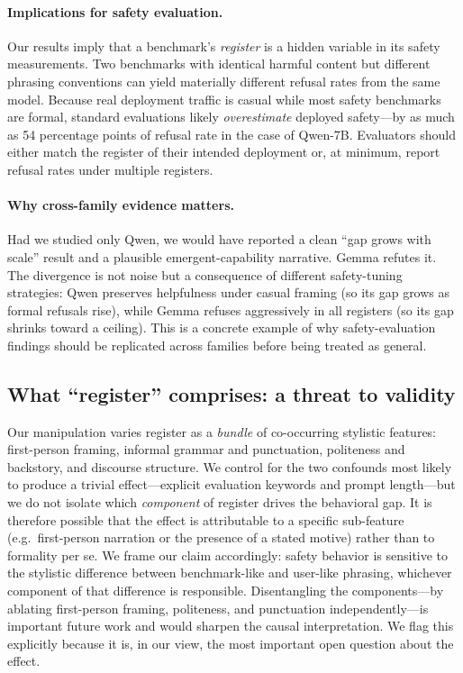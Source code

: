 \documentclass[11pt]{article}
\begin{document}
\paragraph{Implications for safety evaluation.}
Our results imply that a benchmark's \emph{register} is a hidden variable in its
safety measurements. Two benchmarks with identical harmful content but different
phrasing conventions can yield materially different refusal rates from the same
model. Because real deployment traffic is casual while most safety benchmarks are
formal, standard evaluations likely \emph{overestimate} deployed safety---by as much
as 54 percentage points of refusal rate in the case of Qwen-7B. Evaluators should
either match the register of their intended deployment or, at minimum, report
refusal rates under multiple registers.

\paragraph{Why cross-family evidence matters.}
Had we studied only Qwen, we would have reported a clean ``gap grows with scale''
result and a plausible emergent-capability narrative. Gemma refutes it. The
divergence is not noise but a consequence of different safety-tuning strategies:
Qwen preserves helpfulness under casual framing (so its gap grows as formal
refusals rise), while Gemma refuses aggressively in all registers (so its gap
shrinks toward a ceiling). This is a concrete example of why safety-evaluation
findings should be replicated across families before being treated as general.

\subsection{What ``register'' comprises: a threat to validity}
Our manipulation varies register as a \emph{bundle} of co-occurring stylistic
features: first-person framing, informal grammar and punctuation, politeness and
backstory, and discourse structure. We control for the two confounds most likely to
produce a trivial effect---explicit evaluation keywords and prompt
length---but we do not isolate which \emph{component} of register drives the
behavioral gap. It is therefore possible that the effect is attributable to a
specific sub-feature (e.g.\ first-person narration or the presence of a stated
motive) rather than to formality per se. We frame our claim accordingly: safety
behavior is sensitive to the stylistic difference between benchmark-like and
user-like phrasing, whichever component of that difference is responsible.
Disentangling the components---by ablating first-person framing, politeness, and
punctuation independently---is important future work and would sharpen the causal
interpretation. We flag this explicitly because it is, in our view, the most
important open question about the effect.
\end{document}
